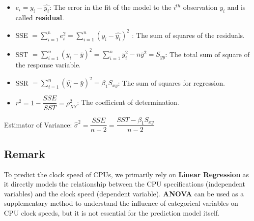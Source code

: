 \begin{itemize}
  \item $e_i = y_i - \hat{y_i}$: The error in the fit of the model to the $i^{th}$ observation $y_i$ and is called \textbf{residual}.
  \item SSE $\displaystyle = \sum_{i=1}^{n} e_i^2 = \sum_{i=1}^{n} (y_i - \hat{y_i})^2 $ : The sum of squares of the residuals.
  \item SST $\displaystyle = \sum_{i=1}^{n}(y_i - \bar{y})^2 = \sum_{i=1}^{n}y_i^2 - n\bar{y}^2 = S_{yy}$: The total sum of square of the response variable.
  \item SSR $\displaystyle = \sum_{i=1}^{n}(\hat{y_i} - \bar{y})^2 = \beta_1S_{xy}$: The sum of squares for regression.
  \item $r^2 = 1 - \dfrac{SSE}{SST} = \rho_{XY}^2$: The coefficient of determination.
\end{itemize}
Estimator of Variance: $ \hat{\sigma}^2 = \dfrac{SSE}{n-2} = \dfrac{SST - \beta_1S_{xy}}{n-2} $


\subsection{Remark}
To predict the clock speed of CPUs, we primarily rely on \textbf{Linear Regression} as it directly models the relationship between the CPU specifications (independent variables) and the clock speed (dependent variable). \textbf{ANOVA} can be used as a supplementary method to understand the influence of categorical variables on CPU clock speeds, but it is not essential for the prediction model itself.

\newpage